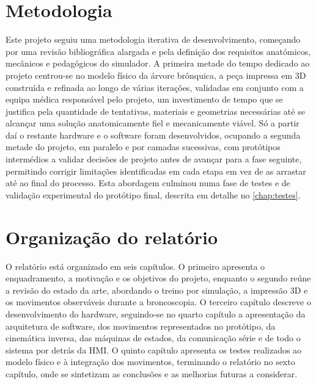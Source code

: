 \section{Metodologia}
Este projeto seguiu uma metodologia iterativa de desenvolvimento, começando por uma revisão bibliográfica alargada e pela definição dos requisitos anatómicos, mecânicos e pedagógicos do simulador. A primeira metade do tempo dedicado ao projeto centrou-se no modelo físico da árvore brônquica, a peça impressa em 3D construída e refinada ao longo de várias iterações, validadas em conjunto com a equipa médica responsável pelo projeto, um investimento de tempo que se justifica pela quantidade de tentativas, materiais e geometrias necessárias até se alcançar uma solução anatomicamente fiel e mecanicamente viável. Só a partir daí o restante hardware e o software foram desenvolvidos, ocupando a segunda metade do projeto, em paralelo e por camadas sucessivas, com protótipos intermédios a validar decisões de projeto antes de avançar para a fase seguinte, permitindo corrigir limitações identificadas em cada etapa em vez de as arrastar até ao final do processo. Esta abordagem culminou numa fase de testes e de validação experimental do protótipo final, descrita em detalhe no \cref{chap:testes}.

\section{Organização do relatório}
O relatório está organizado em seis capítulos. O primeiro apresenta o enquadramento, a motivação e os objetivos do projeto, enquanto o segundo reúne a revisão do estado da arte, abordando o treino por simulação, a impressão 3D e os movimentos observáveis durante a broncoscopia. O terceiro capítulo descreve o desenvolvimento do hardware, seguindo-se no quarto capítulo a apresentação da arquitetura de software, dos movimentos representados no protótipo, da cinemática inversa, das máquinas de estados, da comunicação série e de todo o sistema por detrás da HMI. O quinto capítulo apresenta os testes realizados ao modelo físico e à integração dos movimentos, terminando o relatório no sexto capítulo, onde se sintetizam as conclusões e as melhorias futuras a considerar.

